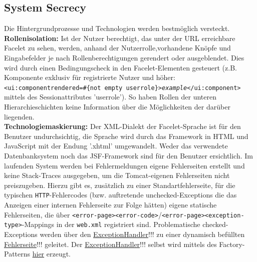 \documentclass{article}
\begin{document}
\subsection{System Secrecy}
Die Hintergrundprozesse und Technologien werden bestmöglich versteckt.\\
\textbf{Rollenisolation:} Ist der Nutzer berechtigt, das unter der URL erreichbare Facelet zu sehen, werden, anhand der Nutzerrolle,vorhandene Knöpfe und Eingabefelder je nach Rollenberechtigungen gerendert oder ausgeblendet. Dies wird durch einen Bedingungscheck in den Facelet-Elementen gesteuert (z.B. Komponente exklusiv für registrierte Nutzer und höher:\\ \texttt{<ui:component\hspace{2mm}rendered=\dq\#\{not empty userrole\}\dq>\textit{example}</ui:component>} mittels des Sessionattributes 'userrole'). So haben Rollen der unteren Hierarchieschichten keine Information über die Möglichkeiten der darüber liegenden.\\
\textbf{Technologiemaskierung:} Der XML-Dialekt der Facelet-Sprache ist für den Benutzer undurchsichtig, die Sprache wird durch das Framework in HTML und JavaScript mit der Endung '.xhtml' umgewandelt. Weder das verwendete Datenbanksystem noch das JSF-Framework sind für den Benutzer ersichtlich. Im laufenden System werden bei Fehlermeldungen eigene Fehlerseiten erstellt und keine Stack-Traces ausgegeben, um die Tomcat-eigenen Fehlerseiten nicht preiszugeben. Hierzu gibt es, zusätzlich zu einer Standartfehlerseite, für die typischen \texttt{HTTP}-Fehlercodes (bzw. auftretende unchecked-Exceptions die  das Anzeigen einer internen Fehlerseite zur Folge hätten) eigene statische Fehlerseiten, die über \texttt{<error-page><error-code>}/\texttt{<error-page><exception-type>}-Mappings in der \texttt{web.xml} registriert sind. Problematische checked-Exceptions werden über den \hyperlink{ExceptionHandler}{ExceptionHandler}!!! zu einer dynamisch befüllten \hyperlink{dynamicerror}{Fehlerseite}!!! geleitet. Der \hyperlink{ExceptionHandler}{ExceptionHandler}!!! selbst wird mittels des Factory-Patterns \hyperlink{ExceptionHandlerFactory}{hier} erzeugt.
\end{document}
